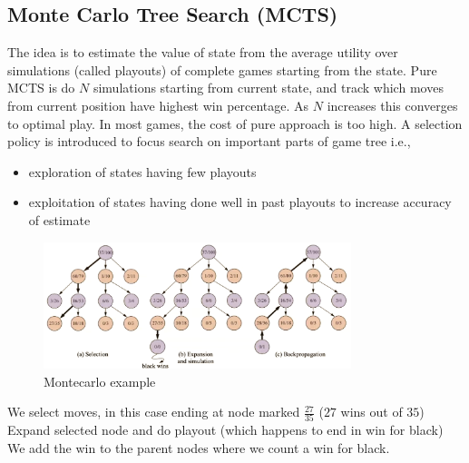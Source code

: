 \documentclass[a4paper]{article}
\theoremstyle{plain}
\theoremstyle{definition}
\theoremstyle{remark}
\begin{document}
\subsection{Monte Carlo Tree Search (MCTS)}
The idea is to estimate the value of state from the average utility over simulations (called playouts) of complete games starting from the state. Pure MCTS is do $N$ simulations starting from current state, and track which moves from current position have highest win percentage. As $N$ increases this converges to optimal play. In most games, the cost of pure approach is too high. A selection policy is introduced to focus search on important parts of game tree i.e.,
\begin{itemize}
	\item exploration of states having few playouts
	\item exploitation of states having done well in past playouts to increase accuracy of estimate
\end{itemize}
\begin{figure}[H]
	\centering
	\includegraphics[width=0.8\textwidth]{eight.png}
	\caption{Montecarlo example}
	\label{fig:eight-png}
\end{figure}
We select moves, in this case ending at node marked $\frac{27}{35}$ ($27$ wins out of $35$) \\
Expand selected node and do playout (which happens to end in win for black) \\
We add the win to the parent nodes where we count a win for black.
\end{document}
